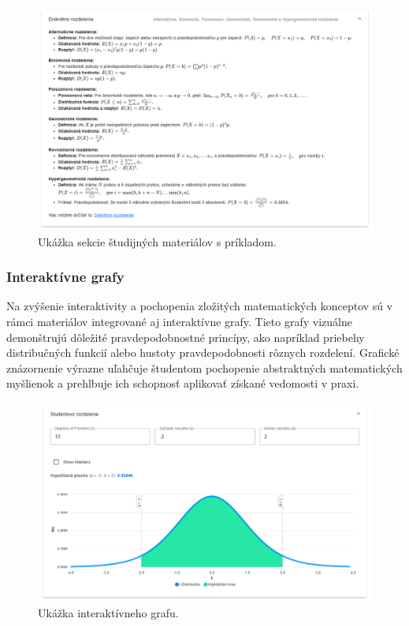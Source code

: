 \begin{figure}[H]
  \centering
  \includegraphics[width=14cm]{img/materialy.png}
  \caption{Ukážka sekcie študijných materiálov s príkladom.}
  \label{materialy}
  \end{figure}

\subsubsection{Interaktívne grafy}
Na zvýšenie interaktivity a pochopenia zložitých matematických konceptov sú v rámci materiálov integrované aj interaktívne grafy. 
Tieto grafy vizuálne demonštrujú dôležité pravdepodobnostné princípy, ako napríklad priebehy distribučných funkcií alebo hustoty pravdepodobnosti rôznych rozdelení. 
Grafické znázornenie výrazne uľahčuje študentom pochopenie abstraktných matematických myšlienok a prehlbuje ich schopnosť aplikovať získané vedomosti v praxi.
\begin{figure}[H]
  \centering
  \includegraphics[width=14cm]{img/grafy.png}
  \caption{Ukážka interaktívneho grafu.}
  \label{grafy}
  \end{figure}

